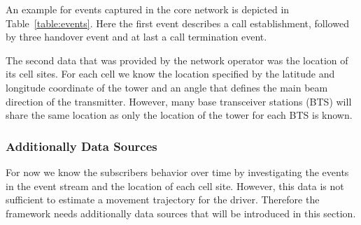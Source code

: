 \documentclass[twocolumn]{bmcart}%
\begin{document}
An example for events captured in the core network is depicted in Table~\ref{table:events}. Here the first event describes a call establishment, followed by three handover event and at last a call termination event.
\newline
%
%
%

The second data that was provided by the network operator was the location of its cell sites. For each cell we know the location specified by the latitude and longitude coordinate of the tower and an angle that defines the main beam direction of the transmitter. However, many base transceiver stations (BTS) will share the same location as only the location of the tower for each BTS is known.

\subsubsection*{Additionally Data Sources}
For now we know the subscribers behavior over time by investigating the events in the event stream and the location of each cell site. However, this data is not sufficient to estimate a movement trajectory for the driver. Therefore the framework needs additionally data sources that will be introduced in this section.
\end{document}
